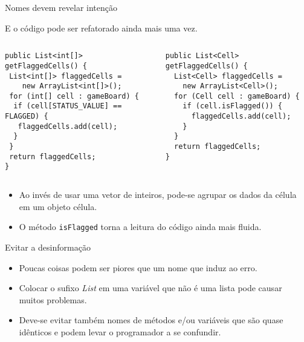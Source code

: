 \documentclass[11pt]{beamer}
\begin{document}
  \begin{frame}[fragile]{Nomes devem revelar intenção}

    E o código pode ser refatorado ainda mais uma vez.
    
    \begin{columns}
      \begin{column}{0.48\textwidth}
        \begin{lstlisting}[basicstyle=\tiny]
public List<int[]> getFlaggedCells() {
 List<int[]> flaggedCells = 
    new ArrayList<int[]>();
 for (int[] cell : gameBoard) {
  if (cell[STATUS_VALUE] == FLAGGED) {
   flaggedCells.add(cell);
  }
 }
 return flaggedCells;
}
        \end{lstlisting}
      \end{column}
      \begin{column}{0.48\textwidth}
        \begin{lstlisting}[basicstyle=\tiny]
public List<Cell> getFlaggedCells() {
  List<Cell> flaggedCells = 
    new ArrayList<Cell>();
  for (Cell cell : gameBoard) {
    if (cell.isFlagged()) {
      flaggedCells.add(cell);
    }
  }
  return flaggedCells;
}
        \end{lstlisting}
      \end{column}
    \end{columns}

    \begin{itemize}
      \item Ao invés de usar uma vetor de inteiros, pode-se agrupar os dados da célula em um objeto célula.
      \item O método \verb|isFlagged| torna a leitura do código ainda mais fluida.
    \end{itemize}
  \end{frame}

  \begin{frame}{Evitar a desinformação}
    \begin{itemize}
      \item Poucas coisas podem ser piores que um nome que induz ao erro.
      \item Colocar o sufixo \textit{List} em uma variável que não é uma lista pode causar muitos problemas.
      \item Deve-se evitar também nomes de métodos e/ou variáveis que são quase idênticos e podem levar o programador a se confundir.
    \end{itemize}
  \end{frame}
\end{document}
